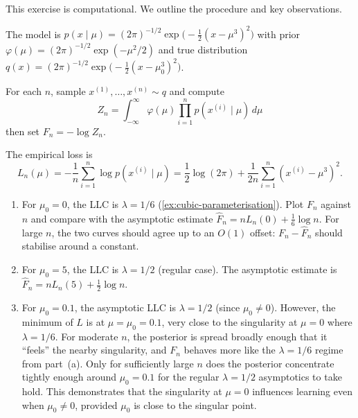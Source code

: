 \documentclass[11pt]{article}
\begin{document}

\begin{solution}
    This exercise is computational. We outline the procedure and key
    observations.

    The model is $p(x \mid \mu) = (2\pi)^{-1/2}
    \exp\!\big({-}\tfrac{1}{2}(x - \mu^3)^2\big)$ with prior
    $\varphi(\mu) = (2\pi)^{-1/2}\exp(-\mu^2/2)$ and true distribution
    $q(x) = (2\pi)^{-1/2}\exp\!\big({-}\tfrac{1}{2}(x-\mu_0^3)^2\big)$.

    For each $n$, sample $x^{(1)}, \ldots, x^{(n)} \sim q$ and compute
    \begin{equation*}
        Z_n
        = \int_{-\infty}^{\infty}
            \varphi(\mu)
            \prod_{i=1}^n p(x^{(i)} \mid \mu)\, d\mu
    \end{equation*}
    then set $F_n = -\log Z_n$.

    The empirical loss is
    \begin{equation*}
        L_n(\mu)
        = -\frac{1}{n}\sum_{i=1}^n \log p(x^{(i)} \mid \mu)
        = \frac{1}{2}\log(2\pi)
          + \frac{1}{2n}\sum_{i=1}^n (x^{(i)} - \mu^3)^2.
    \end{equation*}

    \begin{enumerate}
        \item
            For $\mu_0 = 0$, the LLC is $\lambda = 1/6$
            (\cref{ex:cubic-parameterisation}). Plot $F_n$ against $n$
            and compare with the asymptotic estimate
            $\hat F_n = n L_n(0) + \tfrac{1}{6}\log n$.
            For large $n$, the two curves should agree up to an
            $O(1)$ offset: $F_n - \hat F_n$ should stabilise
            around a constant.
        \item
            For $\mu_0 = 5$, the LLC is $\lambda = 1/2$ (regular case).
            The asymptotic estimate is
            $\hat F_n = n L_n(5) + \tfrac{1}{2}\log n$.
        \item
            For $\mu_0 = 0.1$, the asymptotic LLC is $\lambda = 1/2$
            (since $\mu_0 \neq 0$). However, the minimum of $L$ is at
            $\mu = \mu_0 = 0.1$, very close to the singularity at
            $\mu = 0$ where $\lambda = 1/6$. For moderate $n$, the
            posterior is spread broadly enough that it ``feels'' the
            nearby singularity, and $F_n$ behaves more like the
            $\lambda = 1/6$ regime from part~(a). Only for sufficiently
            large $n$ does the posterior concentrate tightly enough
            around $\mu_0 = 0.1$ for the regular $\lambda = 1/2$
            asymptotics to take hold.
            This demonstrates that the singularity at $\mu = 0$
            influences learning even when $\mu_0 \neq 0$, provided
            $\mu_0$ is close to the singular point. \qedhere
    \end{enumerate}
\end{solution}
\end{document}
